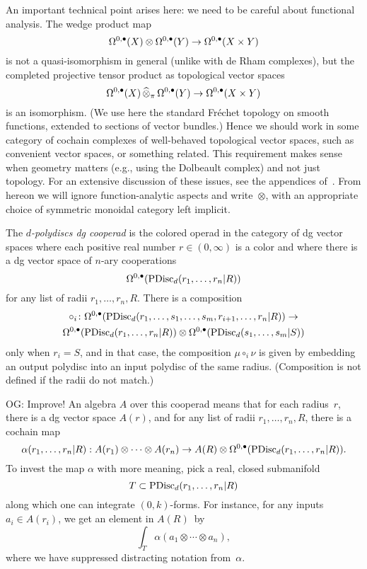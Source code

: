 \documentclass[11pt]{amsart}
\def\owen#1{{\textcolor{violet!50!black}{OG: {#1}}}}
\begin{document}
An important technical point arises here: 
we need to be careful about functional analysis.
The wedge product map
\[
\Omega^{0,\bullet}(X) \otimes \Omega^{0,\bullet}(Y) \to \Omega^{0,\bullet}(X \times Y)
\]
is not a quasi-isomorphism in general (unlike with de Rham complexes),
but the completed projective tensor product as topological vector spaces 
\[
\Omega^{0,\bullet}(X) \,\widehat{\otimes}_\pi\, \Omega^{0,\bullet}(Y) \to \Omega^{0,\bullet}(X \times Y)
\]
is an isomorphism.
(We use here the standard Fr\'echet topology on smooth functions, extended to sections of vector bundles.)
Hence we should work in some category of cochain complexes of well-behaved topological vector spaces, such as convenient vector spaces, or something related.
This requirement makes sense when geometry matters (e.g., using the Dolbeault complex) and not just topology.
For an extensive discussion of these issues, see the appendices of~\cite{CG1}.
From hereon we will ignore function-analytic aspects and write~$\otimes$,
with an appropriate choice of symmetric monoidal category left implicit.

\begin{dfn}
\label{dfn pdisc}
The {\em $d$-polydiscs dg cooperad} is the colored operad in the category of dg vector spaces where each positive real number $r \in (0,\infty)$ is a color 
and where there is a dg vector space of $n$-ary cooperations
\[
\Omega^{0,\bullet}({\rm PDisc}_d(r_1, \ldots, r_n| R)) 
\]
for any list of radii $r_1,\ldots, r_n, R$.
There is a composition
\begin{multline}
\circ_i \colon \Omega^{0,\bullet}({\rm PDisc}_d(r_1, \ldots, s_1, \ldots, s_m, r_{i+1}, \ldots, r_n| R)) \to \\ \Omega^{0,\bullet}({\rm PDisc}_d(r_1, \ldots, r_n| R)) \otimes \Omega^{0,\bullet}({\rm PDisc}_d(s_1, \ldots, s_m| S))
\end{multline}
only when $r_i = S$, 
and in that case, the composition $\mu \circ_i \nu$ is given by embedding an output polydisc into an input polydisc of the same radius.
(Composition is not defined if the radii do not match.)
\end{dfn}

\owen{Improve!}
An algebra $A$ over this cooperad means that for each radius~$r$, 
there is a dg vector space $A(r)$, and for any list of radii $r_1,\ldots, r_n, R$,
there is a cochain map
\[
\alpha(r_1, \ldots, r_n| R): A(r_1) \otimes \cdots \otimes A(r_n) \to A(R) \otimes \Omega^{0,\bullet}({\rm PDisc}_d(r_1, \ldots, r_n| R)) .
\]
To invest the map $\alpha$ with more meaning, 
pick a real, closed submanifold 
\[
T \subset {\rm PDisc}_d(r_1, \ldots, r_n| R)
\]
along which one can integrate $(0,k)$-forms.
For instance, for any inputs $a_i \in A(r_i)$, we get an element in $A(R)$~by
\[
\int_T \alpha(a_1 \otimes \cdots \otimes a_n),
\]
where we have suppressed distracting notation from~$\alpha$.
\end{document}
